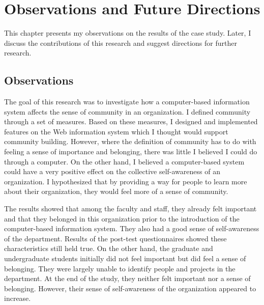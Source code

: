 
\chapter{Observations and Future Directions}
\label{chap:conclusion}


This chapter presents my observations on the results of the case study.  Later,
I discuss the contributions of this research and suggest directions for further
research.

\section{Observations}
The goal of this research was to investigate how a computer-based information
system affects the sense of community in an organization.  I defined community
through a set of measures.  Based on these measures, I designed and implemented
features on the Web information system which I thought would support community
building.  However, where the definition of community has to do with feeling a
sense of importance and belonging, there was little I believed I could do
through a computer.  On the other hand, I believed a computer-based system
could have a very positive effect on the collective self-awareness of an
organization.  I hypothesized that by providing a way for people to learn more
about their organization, they would feel more of a sense of community.

The results showed that among the faculty and staff, they already felt
important and that they belonged in this organization prior to the introduction
of the computer-based information system.  They also had a good sense of
self-awareness of the department.  Results of the post-test questionnaires
showed these characteristics still held true.  On the other hand, the graduate
and undergraduate students initially did not feel important but did feel a
sense of belonging.  They were largely unable to identify people and projects
in the department.  At the end of the study, they neither felt important nor a
sense of belonging.  However, their sense of self-awareness of the organization
appeared to increase.

